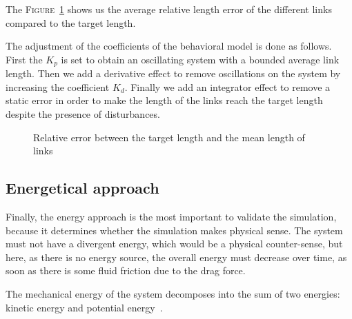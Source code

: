 The \textsc{Figure}~\ref{fig:error_length} shows us the average relative length error of the different links compared to the target length.

The adjustment of the coefficients of the behavioral model is done as follows. First the $K_p$ is set to obtain an oscillating system with a bounded average link length. Then we add a derivative effect to remove oscillations on the system by increasing the coefficient $K_d$. Finally we add an integrator effect to remove a static error in order to make the length of the links reach the target length despite the presence of disturbances.

\begin{figure}[!htb]
    \centering
    
    \caption{Relative error between the target length and the mean length of links}
    \label{fig:error_length}
\end{figure}

\subsection{Energetical approach}

Finally, the energy approach is the most important to validate the simulation, because it determines whether the simulation makes physical sense. The system must not have a divergent energy, which would be a physical counter-sense, but here, as there is no energy source, the overall energy must decrease over time, as soon as there is some fluid friction due to the drag force.

The mechanical energy of the system decomposes into the sum of two energies: kinetic energy and potential energy~\cite{viegas_kinetic_2004}.

